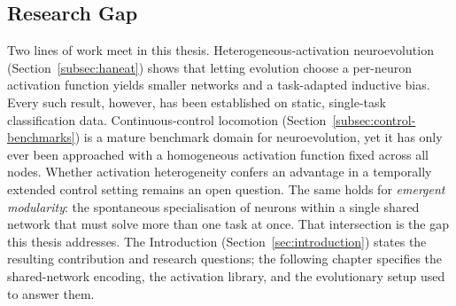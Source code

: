 \documentclass[12pt]{article}
\begin{document}

\subsection{Research Gap}
\label{subsec:research-gap-and-contribution}


Two lines of work meet in this thesis.
Heterogeneous-activation neuroevolution (Section~\ref{subsec:haneat}) shows that letting evolution choose a per-neuron activation function yields smaller networks and a task-adapted inductive bias.
Every such result, however, has been established on static, single-task classification data.
Continuous-control locomotion (Section~\ref{subsec:control-benchmarks}) is a mature benchmark domain for neuroevolution, yet it has only ever been approached with a homogeneous activation function fixed across all nodes.
Whether activation heterogeneity confers an advantage in a temporally extended control setting remains an open question.
The same holds for \emph{emergent modularity}: the spontaneous specialisation of neurons within a single shared network that must solve more than one task at once.
That intersection is the gap this thesis addresses.
The Introduction (Section~\ref{sec:introduction}) states the resulting contribution and research questions; the following chapter specifies the shared-network encoding, the activation library, and the evolutionary setup used to answer them.
\end{document}
